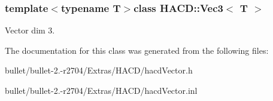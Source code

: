 \subsubsection*{template$<$typename T$>$class H\+A\+C\+D\+::\+Vec3$<$ T $>$}

Vector dim 3. 

The documentation for this class was generated from the following files\+:\begin{DoxyCompactItemize}
\item 
bullet/bullet-\/2.-\/r2704/\+Extras/\+H\+A\+C\+D/hacd\+Vector.\+h\item 
bullet/bullet-\/2.-\/r2704/\+Extras/\+H\+A\+C\+D/hacd\+Vector.\+inl\end{DoxyCompactItemize}
